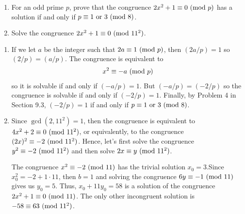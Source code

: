\begin{exercise}
    \begin{enumerate}
        \item For an odd prime $p$, prove that the congruence $2x^2 + 1 \equiv 0 \ (\mathrm{mod}\ p)$ has a solution if and only if $p \equiv 1 \text{ or } 3 \ (\mathrm{mod}\ 8)$.
        \item Solve the congruence $2x^2 + 1 \equiv 0 \ (\mathrm{mod}\ 11^2)$. \\
    \end{enumerate}
\end{exercise}

\begin{solution}
    \begin{enumerate}
        \item If we let $a$ be the integer such that $2a \equiv 1 \ (\mathrm{mod}\ p)$, then $(2a/p) = 1$ so $(2/p) = (a/p)$. The congruence is equivalent to
        $$x^2 \equiv -a \ (\mathrm{mod}\ p)$$
        so it is solvable if and only if $(-a/p) = 1$. But $(-a/p) = (-2/p)$ so the congruence is solvable if and only if $(-2/p) = 1$. Finally, by Problem 4 in Section 9.3, $(-2/p) = 1$ if and only if $p \equiv 1 \text{ or } 3 \ (\mathrm{mod}\ 8)$.
        \item Since $\gcd(2, 11^2) = 1$, then the congruence is equivalent to $4x^2 + 2 \equiv 0 \ (\mathrm{mod}\ 11^2)$, or equivalently, to the congruence $(2x)^2 \equiv -2 \ (\mathrm{mod}\ 11^2)$. Hence, let's first solve the congruence $y^2 \equiv -2 \ (\mathrm{mod}\ 11^2)$ and then solve $2x \equiv y \ (\mathrm{mod}\ 11^2)$.
        
        The congruence $x^2 \equiv -2 \ (\mathrm{mod}\ 11)$ has the trivial solution $x_0 = 3$.Since $x_0^2 = -2 + 1\cdot 11$, then $b = 1$ and solving the congruence $6y \equiv -1 \ (\mathrm{mod}\ 11)$ gives us $y_0 = 5$. Thus, $x_0 + 11y_0 = 58$ is a solution of the congruence $2x^2 + 1 \equiv 0 \ (\mathrm{mod}\ 11)$. The only other incongruent solution is $-58 \equiv 63 \ (\mathrm{mod}\ 11^2)$.\\
    \end{enumerate}
\end{solution}

